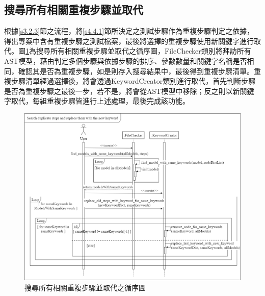 \subsection{搜尋所有相關重複步驟並取代}\label{s4.4.2}
%
\indent
根據\ref{s3.2.3}節之流程，將\ref{s4.4.1}節所決定之測試步驟作為重複步驟判定之依據，得出專案中含有重複步驟之測試檔案，最後將選擇的重複步驟使用新關鍵字進行取代。圖\ref{f4.5}為搜尋所有相關重複步驟並取代之循序圖，FileChecker類別將拜訪所有AST模型，藉由判定多個步驟與依據步驟的排序、參數數量和關鍵字名稱是否相同，確認其是否為重複步驟，如是則存入搜尋結果中，最後得到重複步驟清單。重複步驟清單經過選擇後，將會透過KeywordCreator類別進行取代，首先判斷步驟是否為重複步驟之最後一步，若不是，將會從AST模型中移除；反之則以新關鍵字取代，每組重複步驟皆進行上述處理，最後完成該功能。

\begin{figure}[H]
	\centering
    \includegraphics[width=1.0\textwidth]{picture/ch4/sequenceDiagram/Search_duplicate_steps_and_replace_sequence_diagram.png}
    \caption{搜尋所有相關重複步驟並取代之循序圖}
    \label{f4.5}
\end{figure}

